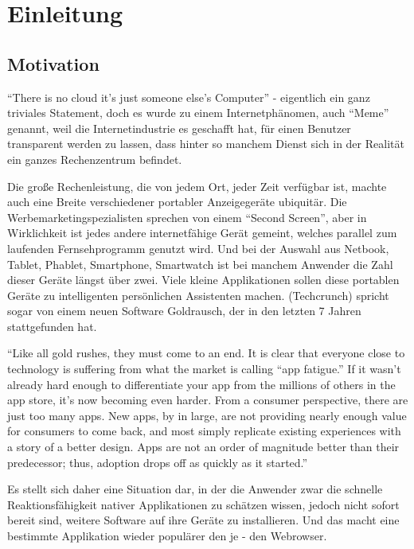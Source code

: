\chapter{Einleitung}

\section{Motivation}
\label{sec:motivation}

 \enquote{There is no cloud it's just someone else's Computer} - eigentlich ein ganz triviales Statement, doch es wurde zu einem Internetphänomen, auch \enquote{Meme} genannt, weil die Internetindustrie es geschafft hat, für einen Benutzer transparent werden zu lassen, dass hinter so manchem Dienst sich in der Realität ein ganzes Rechenzentrum befindet.

Die große Rechenleistung, die von jedem Ort, jeder Zeit verfügbar ist, machte auch eine Breite verschiedener portabler Anzeigegeräte ubiquitär. Die Werbemarketingspezialisten sprechen von einem \enquote{Second Screen}, aber in Wirklichkeit ist jedes andere internetfähige Gerät gemeint, welches parallel zum laufenden Fernsehprogramm genutzt wird. Und bei der Auswahl aus Netbook, Tablet, Phablet, Smartphone, Smartwatch ist bei manchem Anwender die Zahl dieser Geräte längst über zwei. Viele kleine Applikationen sollen diese portablen Geräte zu intelligenten persönlichen Assistenten machen. (Techcrunch) spricht sogar von einem neuen Software Goldrausch, der in den letzten 7 Jahren stattgefunden hat.

\enquote{Like all gold rushes, they must come to an end. It is clear that everyone close to technology is suffering from what the market is calling “app fatigue.” If it wasn’t already hard enough to differentiate your app from the millions of others in the app store, it’s now becoming even harder. From a consumer perspective, there are just too many apps. New apps, by in large, are not providing nearly enough value for consumers to come back, and most simply replicate existing experiences with a story of a better design. Apps are not an order of magnitude better than their predecessor; thus, adoption drops off as quickly as it started.}  \cite{Schippers:2006}

Es stellt sich daher eine Situation dar, in der die Anwender zwar die schnelle Reaktionsfähigkeit nativer Applikationen zu schätzen wissen, jedoch nicht sofort bereit sind, weitere Software auf ihre Geräte zu installieren. Und das macht eine bestimmte Applikation wieder populärer den je - den Webrowser.

